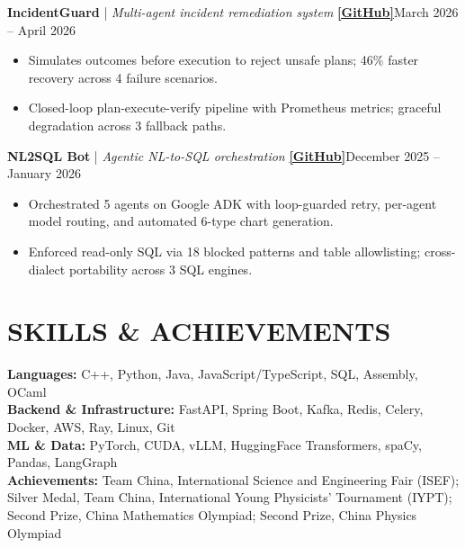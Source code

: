 \documentclass[10pt,letterpaper]{article}
\newcommand{\ressection}[1]{\section*{#1}}
\begin{document}
\vspace{3pt}
\textbf{IncidentGuard} \;|\; \textit{Multi-agent incident remediation system} \textbf{\href{https://github.com/hanshengzhu0001/stratusxpennai}{[GitHub]}}\hfill March 2026 -- April 2026
\begin{itemize}
    \item Simulates outcomes before execution to reject unsafe plans; 46\% faster recovery across 4 failure scenarios.
    \item Closed-loop plan-execute-verify pipeline with Prometheus metrics; graceful degradation across 3 fallback paths.
\end{itemize}
\vspace{3pt}
\textbf{NL2SQL Bot} \;|\; \textit{Agentic NL-to-SQL orchestration} \textbf{\href{https://github.com/ArtysicistZ/NL2SQL_Bot.git}{[GitHub]}}\hfill December 2025 -- January 2026
\begin{itemize}
    \item Orchestrated 5 agents on Google ADK with loop-guarded retry, per-agent model routing, and automated 6-type chart generation.
    \item Enforced read-only SQL via 18 blocked patterns and table allowlisting; cross-dialect portability across 3 SQL engines.
\end{itemize}

\ressection{SKILLS \& ACHIEVEMENTS}
\vspace{2pt}
\textbf{Languages:} C++, Python, Java, JavaScript/TypeScript, SQL, Assembly, OCaml \\
\textbf{Backend \& Infrastructure:} FastAPI, Spring Boot, Kafka, Redis, Celery, Docker, AWS, Ray, Linux, Git \\
\textbf{ML \& Data:} PyTorch, CUDA, vLLM, HuggingFace Transformers, spaCy, Pandas, LangGraph \\
\textbf{Achievements:} Team China, International Science and Engineering Fair (ISEF); Silver Medal, Team China, International Young Physicists' Tournament (IYPT); Second Prize, China Mathematics Olympiad; Second Prize, China Physics Olympiad
\end{document}
